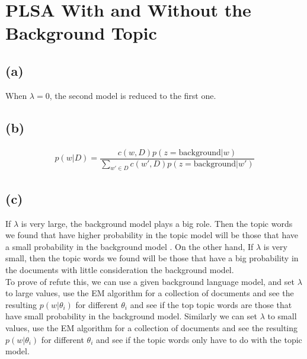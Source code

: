 

\oddsidemargin 0in
\evensidemargin 0in
\textwidth 6.5in
\topmargin -0.5in
\textheight 9.0in
\usepackage{amsmath}
\usepackage{graphicx}





\pagestyle{myheadings}  %

\section{PLSA With and Without the Background Topic}

\subsection*{(a)}
When $\lambda = 0$, the second model is reduced to the first one. 

\subsection*{(b)}
\begin{align*}
p(w|D)= \dfrac{c(w,D)p(z=\text{background}|w)}{\sum_{w'\in D}c(w',D)p(z=\text{background}|w')}
\end{align*}

\subsection*{(c)}
If $\lambda$ is very large, the background model plays a big role. Then the topic words we found that have higher probability in the topic model will be those that have a small probability in the background model . On the other hand, If $\lambda$ is very small, then the topic words we found will be those that have a big probability in the documents with little consideration the background model.\\
To prove of refute this, we can use a given background language model, and set $\lambda$ to large values, use the EM algorithm for a collection of documents and see the resulting $p(w|\theta_i)$ for different $\theta_i$ and see if the top topic words are those that have small probability in the background model. Similarly we can set $\lambda$ to small values, use the EM algorithm for a collection of documents and see the resulting $p(w|\theta_i)$ for different $\theta_i$ and see if the topic words only have to do with the topic model. 

